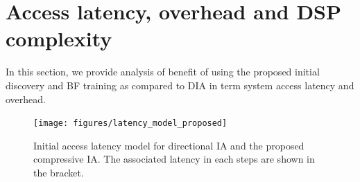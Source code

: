 \documentclass[journal]{IEEEtran}
\begin{document}
% 
%
\section{Access latency, overhead and DSP complexity}
\label{sec:comparison_analysis}



In this section, we provide analysis of benefit of using the proposed initial discovery and BF training as compared to DIA in term system access latency and overhead.

\begin{figure}
\begin{center}
\texttt{[image: figures/latency\_model\_proposed]}
\end{center}
\vspace{-2mm}
\caption{Initial access latency model for directional IA and the proposed compressive IA. The associated latency in each steps are shown in the bracket.}
\vspace{-2mm}
\label{fig:latency_model}
\end{figure}
\end{document}
